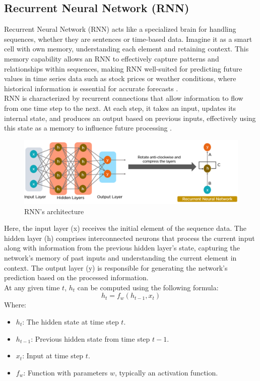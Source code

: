 \documentclass{ieeeojies}
\begin{document}
\subsection{Recurrent Neural Network (RNN)}
Recurrent Neural Network (RNN) acts like a specialized brain for handling sequences, whether they are sentences or time-based data. Imagine it as a smart cell with own memory, understanding each element and retaining context. This memory capability allows an RNN to effectively capture patterns and relationships within sequences, making RNN well-suited for predicting future values in time series data such as stock prices or weather conditions, where historical information is essential for accurate forecasts \cite{b13}.\\
RNN is characterized by recurrent connections that allow information to flow from one time step to the next. At each step, it takes an input, updates its internal state, and produces an output based on previous inputs, effectively using this state as a memory to influence future processing \cite{b14}.\\
\begin{figure}[H]
  \centering
  \begin{minipage}{0.5\linewidth}
    \centering
    \includegraphics[width=\linewidth]{bibliography/Figure/models/RNN.png}
    \caption{RNN's architecture}
    \label{fig8}
  \end{minipage}
\end{figure}
Here, the input layer (x) receives the initial element of the sequence data. The hidden layer (h) comprises interconnected neurons that process the current input along with information from the previous hidden layer's state, capturing the network's memory of past inputs and understanding the current element in context. The output layer (y) is responsible for generating the network's prediction based on the processed information.\\
At any given time \( t \), \( h_t \) can be computed using the following formula:
\[
h_t = f_w(h_{t-1}, x_t)
\]
Where:
\begin{itemize}
  \item \( h_t \): The hidden state at time step \( t \).
  \item \( h_{t-1} \): Previous hidden state from time step \( t-1 \).
  \item \( x_t \): Input at time step \( t \).
  \item \( f_w \): Function with parameters \( w \), typically an activation function.
\end{itemize}
\end{document}
